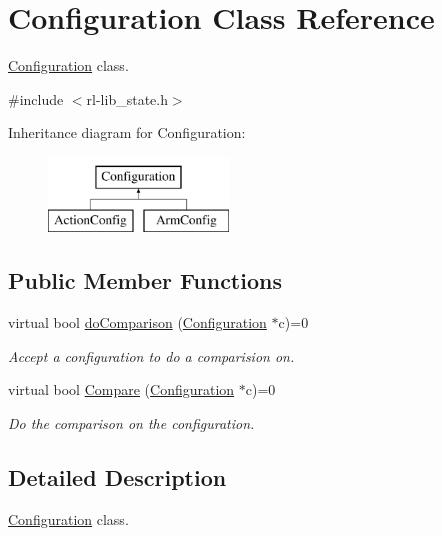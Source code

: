 \hypertarget{classConfiguration}{\section{Configuration Class Reference}
\label{classConfiguration}
}


\hyperlink{classConfiguration}{Configuration} class.  




{\ttfamily \#include $<$rl-\/lib\-\_\-state.\-h$>$}

Inheritance diagram for Configuration\-:\begin{figure}[H]
\begin{center}
\leavevmode
\includegraphics[height=2.000000cm]{classConfiguration}
\end{center}
\end{figure}
\subsection*{Public Member Functions}
\begin{DoxyCompactItemize}
\item 
virtual bool \hyperlink{classConfiguration_a0bc4a5154c2836cc8976049810b35548}{do\-Comparison} (\hyperlink{classConfiguration}{Configuration} $\ast$c)=0
\begin{DoxyCompactList}\small\item\em Accept a configuration to do a comparision on. \end{DoxyCompactList}\item 
virtual bool \hyperlink{classConfiguration_a82f926a9b9ea439862089f1d6c06b3e0}{Compare} (\hyperlink{classConfiguration}{Configuration} $\ast$c)=0
\begin{DoxyCompactList}\small\item\em Do the comparison on the configuration. \end{DoxyCompactList}\end{DoxyCompactItemize}


\subsection{Detailed Description}
\hyperlink{classConfiguration}{Configuration} class. 

